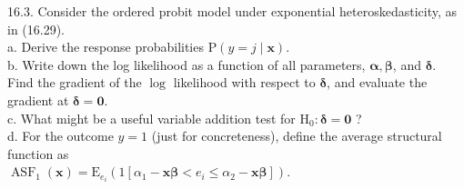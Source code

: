 \documentclass[10pt]{article}
\begin{document}
16.3. Consider the ordered probit model under exponential heteroskedasticity, as in (16.29).\\
a. Derive the response probabilities $\mathrm{P}(y=j \mid \mathbf{x})$.\\
b. Write down the log likelihood as a function of all parameters, $\boldsymbol{\alpha}, \boldsymbol{\beta}$, and $\boldsymbol{\delta}$. Find the gradient of the $\log$ likelihood with respect to $\boldsymbol{\delta}$, and evaluate the gradient at $\boldsymbol{\delta}=\mathbf{0}$.\\
c. What might be a useful variable addition test for $\mathrm{H}_{0}: \boldsymbol{\delta}=\mathbf{0}$ ?\\
d. For the outcome $y=1$ (just for concreteness), define the average structural function as\\
$\operatorname{ASF}_{1}(\mathbf{x})=\mathrm{E}_{e_{i}}\left(1\left[\alpha_{1}-\mathbf{x} \boldsymbol{\beta}<e_{i} \leq \alpha_{2}-\mathbf{x} \boldsymbol{\beta}\right]\right)$.
\end{document}
